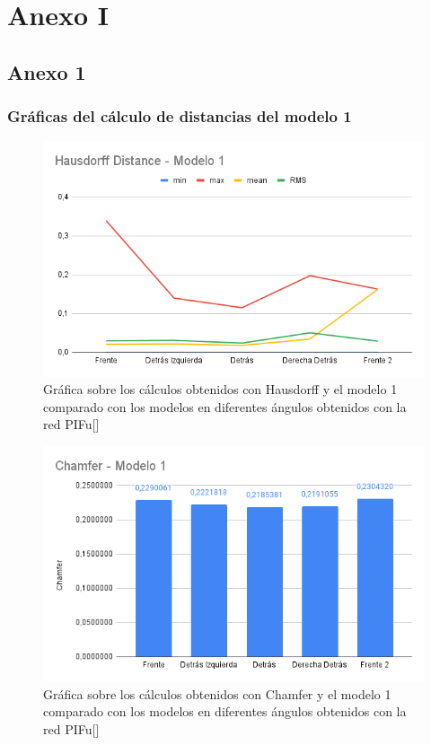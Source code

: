
\chapter{Anexo I}
\label{anexos}

\section{Anexo 1}
\subsection{Gráficas del cálculo de distancias del modelo 1}
\begin{figure}[H]
	\centering
	\includegraphics[scale=0.55]{imagenes/Hausdorff-M1.png}
	\caption{Gráfica sobre los cálculos obtenidos con Hausdorff y el modelo 1 comparado con los modelos en diferentes ángulos obtenidos con la red PIFu[\cite{pifu}]}
	\label{fig:figura14}
\end{figure}

\begin{figure}[H]
	\centering
	\includegraphics[scale=0.55]{imagenes/Chamfer-M1.png}
	\caption{Gráfica sobre los cálculos obtenidos con Chamfer y el modelo 1 comparado con los modelos en diferentes ángulos obtenidos con la red PIFu[\cite{pifu}]}
	\label{fig:figura15}
\end{figure}

